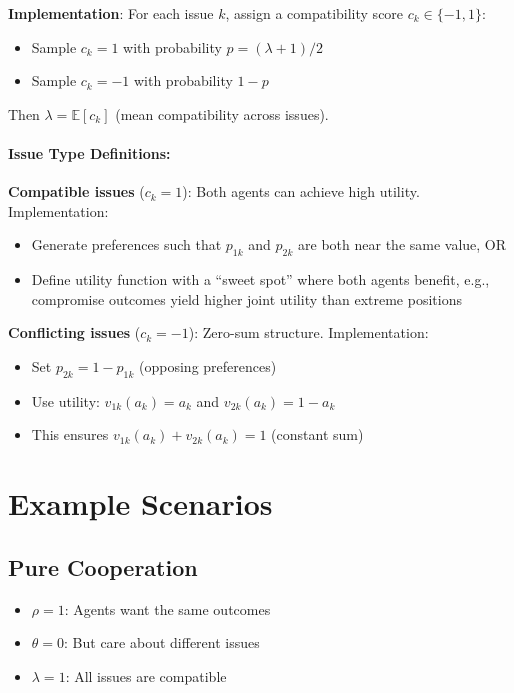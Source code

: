 \documentclass[11pt]{article}
\begin{document}
\textbf{Implementation}: For each issue $k$, assign a compatibility score $c_k \in \{-1, 1\}$:
\begin{itemize}
    \item Sample $c_k = 1$ with probability $p = (\lambda + 1)/2$
    \item Sample $c_k = -1$ with probability $1-p$
\end{itemize}

Then $\lambda = \mathbb{E}[c_k]$ (mean compatibility across issues).

\paragraph{Issue Type Definitions:}

\textbf{Compatible issues} ($c_k = 1$): Both agents can achieve high utility. Implementation:
\begin{itemize}
    \item Generate preferences such that $p_{1k}$ and $p_{2k}$ are both near the same value, OR
    \item Define utility function with a ``sweet spot'' where both agents benefit, e.g., compromise outcomes yield higher joint utility than extreme positions
\end{itemize}

\textbf{Conflicting issues} ($c_k = -1$): Zero-sum structure. Implementation:
\begin{itemize}
    \item Set $p_{2k} = 1 - p_{1k}$ (opposing preferences)
    \item Use utility: $v_{1k}(a_k) = a_k$ and $v_{2k}(a_k) = 1 - a_k$
    \item This ensures $v_{1k}(a_k) + v_{2k}(a_k) = 1$ (constant sum)
\end{itemize}

\section{Example Scenarios}

\subsection{Pure Cooperation}
\begin{itemize}
    \item $\rho = 1$: Agents want the same outcomes
    \item $\theta = 0$: But care about different issues
    \item $\lambda = 1$: All issues are compatible
\end{itemize}
\end{document}
